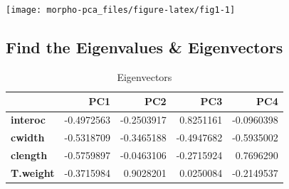 \documentclass[]{article}
\newenvironment{Shaded}{\begin{snugshade}}{\end{snugshade}}
\newcommand{\CommentTok}[1]{\textcolor[rgb]{0.56,0.35,0.01}{\textit{#1}}}
\newcommand{\KeywordTok}[1]{\textcolor[rgb]{0.13,0.29,0.53}{\textbf{#1}}}
\newcommand{\NormalTok}[1]{#1}
\newcommand{\OperatorTok}[1]{\textcolor[rgb]{0.81,0.36,0.00}{\textbf{#1}}}
\newcommand{\StringTok}[1]{\textcolor[rgb]{0.31,0.60,0.02}{#1}}
\begin{document}
\begin{center}\texttt{[image: morpho-pca\_files/figure-latex/fig1-1]} \end{center}

\hypertarget{find-the-eigenvalues-eigenvectors}{%
\subsection{Find the Eigenvalues \&
Eigenvectors}\label{find-the-eigenvalues-eigenvectors}}

\begin{Shaded}
\end{Shaded}

\begin{table}[t]

\caption{\label{tab:unnamed-chunk-6}Eigenvectors}
\centering
\begin{tabular}{>{\bfseries}l|r|r|r|r}
\hline
  & PC1 & PC2 & PC3 & PC4\\
\hline
interoc & -0.4972563 & -0.2503917 & 0.8251161 & -0.0960398\\
\hline
cwidth & -0.5318709 & -0.3465188 & -0.4947682 & -0.5935002\\
\hline
clength & -0.5759897 & -0.0463106 & -0.2715924 & 0.7696290\\
\hline
T.weight & -0.3715984 & 0.9028201 & 0.0250084 & -0.2149537\\
\hline
\end{tabular}
\end{table}
\end{document}
